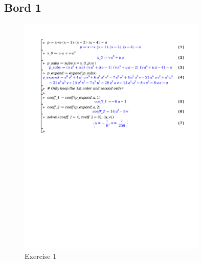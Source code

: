 \documentclass[a4paper]{report}
\begin{document}
\newpage
\subsection*{Bord 1}

\begin{figure}[!htbp]
	\centering
	\includegraphics[width=0.8\textwidth]{./exercises/bordles_1.pdf}
	\caption{Exercise 1}
\end{figure}
\end{document}
